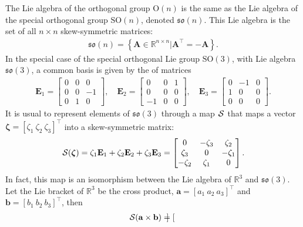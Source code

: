 \begin{example}
    The Lie algebra of the orthogonal group $\text{O}(n)$ is the same as the Lie algebra of the special orthogonal group $\text{SO}(n)$, denoted $\mathfrak{so}(n)$. This Lie algebra is the set of all $n\times n$ skew-symmetric matrices:
    \begin{align*}
        \mathfrak{so}(n) = \left\{\mathbf{A}\in\mathbb{R}^{n\times n} | \mathbf{A}^\top = -\mathbf{A}\right\}.
    \end{align*}
    In the special case of the special orthogonal Lie group $\text{SO}(3)$, with Lie algebra $\mathfrak{so}(3)$, a common basis is given by the of matrices
    \begin{align*}
        \mathbf{E}_1 = \begin{bmatrix} 0 & 0 & 0 \\ 0 & 0 & -1 \\ 0 & 1 & 0 \end{bmatrix}, \quad \mathbf{E}_2 = \begin{bmatrix} 0 & 0 & 1 \\ 0 & 0 & 0 \\ -1 & 0 & 0 \end{bmatrix}, \quad \mathbf{E}_3 = \begin{bmatrix} 0 & -1 & 0 \\ 1 & 0 & 0 \\ 0 & 0 & 0 \end{bmatrix}.
    \end{align*}
    It is usual to represent elements of $\mathfrak{so}(3)$ through a map $\SL$ that maps a vector $\boldsymbol{\zeta} = [\zeta_1\ \zeta_2\ \zeta_3]^\top$ into a skew-symmetric matrix:
    \begin{align*}
        \SL[\boldsymbol{\zeta}] = \zeta_1 \mathbf{E}_1 + \zeta_2 \mathbf{E}_2 + \zeta_3 \mathbf{E}_3
        = \begin{bmatrix} 0 & -\zeta_3 & \zeta_2 \\ \zeta_3 & 0 & -\zeta_1 \\ -\zeta_2 & \zeta_1 & 0 \end{bmatrix}.
    \end{align*}
    In fact, this map is an isomorphism between the Lie algebra of $\mathbb{R}^3$ and $\mathfrak{so}(3)$. Let the Lie bracket of $\mathbb{R}^3$ be the cross product, $\mathbf{a} = [a_1\ a_2\ a_3]^\top$ and $\mathbf{b} = [b_1\ b_2\ b_3]^\top$, then 
    \begin{align*}
        \SL[\mathbf{a}\times \mathbf{b}] &= \begin{bmatrix}

\end{bmatrix}
\end{align*}
\end{example}
